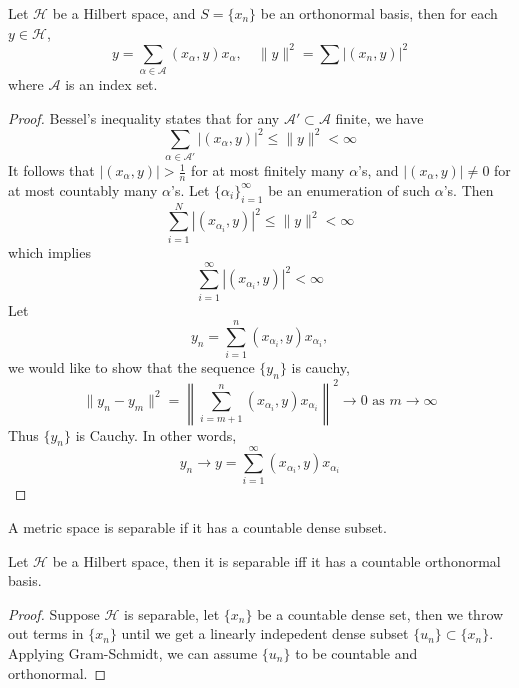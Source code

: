 \documentclass[openany]{book}
\begin{document}
\begin{prop}
    Let $\mathcal{H}$ be a Hilbert space, and $S=\{x_n\}$ be an orthonormal basis, then for each $y\in\mathcal{H}$, 
    \begin{equation*}
        y=\sum_{\alpha\in\mathcal{A}}(x_\alpha,y)x_\alpha, \quad \|y\|^2=\sum|(x_n,y)|^2
    \end{equation*}
    where $\mathcal{A}$ is an index set.
\end{prop}
\begin{proof}
    Bessel's inequality states that for any $\mathcal{A}'\subset\mathcal{A}$ finite, we have 
    \begin{equation*}
        \sum_{\alpha\in\mathcal{A}'}|(x_\alpha,y)|^2\leq\|y\|^2<\infty
    \end{equation*}
    It follows that $|(x_\alpha,y)|>\frac{1}{n}$ for at most finitely many $\alpha$'s, and $|(x_\alpha,y)|\neq 0$ for at most countably many $\alpha$'s. Let $\{\alpha_i\}_{i=1}^\infty$ be an enumeration of such $\alpha$'s. Then 
    \begin{equation*}
        \sum_{i=1}^N|(x_{\alpha_i},y)|^2\leq\|y\|^2<\infty
    \end{equation*}
    which implies 
    \begin{equation*}
        \sum_{i=1}^\infty|(x_{\alpha_i},y)|^2<\infty
    \end{equation*}
    Let 
    \begin{equation*}
        y_n=\sum_{i=1}^n(x_{\alpha_i},y)x_{\alpha_i}, 
    \end{equation*}
    we would like to show that the sequence $\{y_n\}$ is cauchy, 
    \begin{equation*}
        \|y_n-y_m\|^2=\left\|\sum_{i=m+1}^n(x_{\alpha_i}, y)x_{\alpha_i}\right\|^2\to 0 \text{ as } m\to\infty
    \end{equation*}
    Thus $\{y_n\}$ is Cauchy. In other words,
    \begin{equation*}
        y_n\to y=\sum_{i=1}^\infty (x_{\alpha_i},y)x_{\alpha_i}
    \end{equation*}
\end{proof}


\begin{defn}
    A metric space is separable if it has a countable dense subset.
\end{defn}

\begin{prop}[II.7]
    Let $\mathcal{H}$ be a Hilbert space, then it is separable iff it has a countable orthonormal basis.
\end{prop}
\begin{proof}
    Suppose $\mathcal{H}$ is separable, let $\{x_n\}$ be a countable dense set, then we throw out terms in $\{x_n\}$ until we get a linearly indepedent dense subset $\{u_n\}\subset \{x_n\}$. Applying Gram-Schmidt, we can assume $\{u_n\}$ to be countable and orthonormal.
\end{proof}
\end{document}

